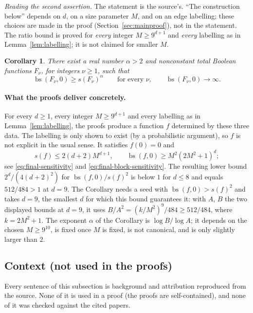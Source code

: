 \documentclass[11pt]{article}
\newcommand{\bs}{\operatorname{bs}}
\newtheorem{corollary}[theorem]{Corollary}
\theoremstyle{definition}
\theoremstyle{remark}
\begin{document}
\noindent\emph{Reading the second assertion.} The statement is the source's.
``The construction below'' depends on \(d\), on a size parameter \(M\), and
on an edge labelling; these choices are made in the proof
(Section~\ref{sec:mainproof}), not in the statement. The ratio bound is
proved for \emph{every} integer \(M\ge9^{d+1}\) and \emph{every} labelling
as in Lemma~\ref{lem:labelling}; it is not claimed for smaller \(M\).

\begin{corollary}\label{cor:power-separation}
There exist a real number \(\alpha>2\) and nonconstant total Boolean
functions \(F_\nu\), for integers \(\nu\geq1\), such that
\[
 \bs(F_\nu,0)\geq s(F_\nu)^\alpha
 \qquad\text{for every }\nu,
 \qquad
 \bs(F_\nu,0)\longrightarrow\infty .
\]
\end{corollary}

\paragraph{What the proofs deliver concretely.}
For every \(d\ge1\), every integer \(M\ge9^{d+1}\) and every labelling as in
Lemma~\ref{lem:labelling}, the proofs produce a function \(f\) determined by
these three data. The labelling is only shown to exist (by a probabilistic
argument), so \(f\) is not explicit in the usual sense. It satisfies
\(f(0)=0\) and
\[
 s(f)\le 2(d+2)M^{d+1},\qquad \bs(f,0)\ge M^2(2M^2+1)^d ;
\]
see \eqref{eq:final-sensitivity} and \eqref{eq:final-block-sensitivity}.
The resulting lower bound \(2^d/(4(d+2)^2)\) for \(\bs(f,0)/s(f)^2\) is below
\(1\) for \(d\le 8\) and equals \(512/484>1\) at \(d=9\). The Corollary needs
a seed with \(\bs(f,0)>s(f)^2\) and takes \(d=9\), the smallest \(d\) for
which this bound guarantees it: with \(A\), \(B\) the two displayed
bounds at \(d=9\), it uses \(B/A^2=(k/M^2)^9/484\ge512/484\), where
\(k=2M^2+1\).
The exponent \(\alpha\) of the Corollary is \(\log B/\log A\); it depends on
the chosen \(M\ge 9^{10}\), is fixed once \(M\) is fixed, is not canonical,
and is only slightly larger than \(2\).

\subsection{Context (not used in the proofs)}
\label{sec:context}

Every sentence of this subsection is background and attribution reproduced
from the source. None of it is used in a proof (the proofs are
self-contained), and none of it was checked against the cited papers.
\end{document}
